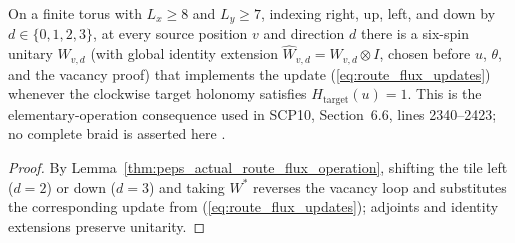 \begin{lemma}
    \label{thm:peps_vacant_plaquette_physical_move}
    \leanok
    On a finite torus with $L_x\ge 8$ and $L_y\ge 7$, indexing right, up, left, and down by $d\in\{0,1,2,3\}$, at every source position $v$ and direction $d$ there is a six-spin unitary $W_{v,d}$ (with global identity extension $\widehat W_{v,d}=W_{v,d}\otimes I$, chosen before $u$, $\theta$, and the vacancy proof) that implements the update (\ref{eq:route_flux_updates}) whenever the clockwise target holonomy satisfies $H_{\mathrm{target}}(u)=1$.
    This is the elementary-operation consequence used in SCP10, Section~6.6, lines 2340--2423; no complete braid is asserted here \cite{gap:rmp_peps_quantum_double_g_isometry}.
\end{lemma}
\begin{proof}\leanok
    By Lemma~\ref{thm:peps_actual_route_flux_operation}, shifting the tile left ($d=2$) or down ($d=3$) and taking $W^*$ reverses the vacancy loop and substitutes the corresponding update from (\ref{eq:route_flux_updates}); adjoints and identity extensions preserve unitarity.
\end{proof}
